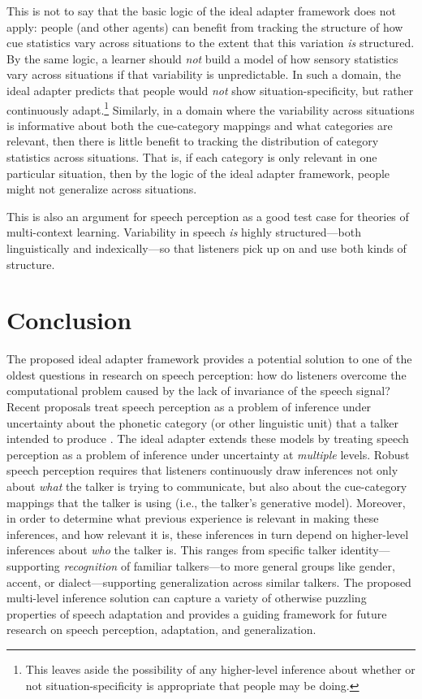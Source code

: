 This is not to say that the basic logic of the ideal adapter framework does not apply: people (and other agents) can benefit from tracking the structure of how cue statistics vary across situations to the extent that this variation \emph{is} structured.  By the same logic, a learner should \emph{not} build a model of how sensory statistics vary across situations if that variability is unpredictable.  In such a domain, the ideal adapter predicts that people would \emph{not} show situation-specificity, but rather continuously adapt.\footnote{This leaves aside the possibility of any higher-level inference about whether or not situation-specificity is appropriate that people may be doing.}  Similarly, in a domain where the variability across situations is informative about both the cue-category mappings and what categories are relevant, then there is little benefit to tracking the distribution of category statistics across situations.  That is, if each category is only relevant in one particular situation, then by the logic of the ideal adapter framework, people might not generalize across situations.

This is also an argument for speech perception as a good test case for theories of multi-context learning.  Variability in speech \emph{is} highly structured---both linguistically and indexically---so that listeners pick up on and use both kinds of structure.  

\section{Conclusion}
\label{sec:conclusion}


The proposed ideal adapter framework provides a potential solution to one of the oldest questions in research on speech perception: how do listeners overcome the computational problem caused by the lack of invariance of the speech signal?  Recent proposals treat speech perception as a problem of inference under uncertainty about the phonetic category (or other linguistic unit) that a talker intended to produce \autocite[e.g.,][]{Clayards2008,Feldman2009a,Norris2008}.  The ideal adapter extends these models by treating speech perception as a problem of inference under uncertainty at \emph{multiple} levels. Robust speech perception requires that listeners continuously draw inferences not only about \emph{what} the talker is trying to communicate, but also about the cue-category mappings that the talker is using (i.e., the talker's generative model).  Moreover, in order to determine what previous experience is relevant in making these inferences, and how relevant it is, these inferences in turn depend on higher-level inferences about \emph{who} the talker is.  This ranges from specific talker identity---supporting \emph{recognition} of familiar talkers---to more general groups like gender, accent, or dialect---supporting generalization across similar talkers.   The proposed multi-level inference solution can capture a variety of otherwise puzzling properties of speech adaptation and provides a guiding framework for future research on speech perception, adaptation, and generalization.

